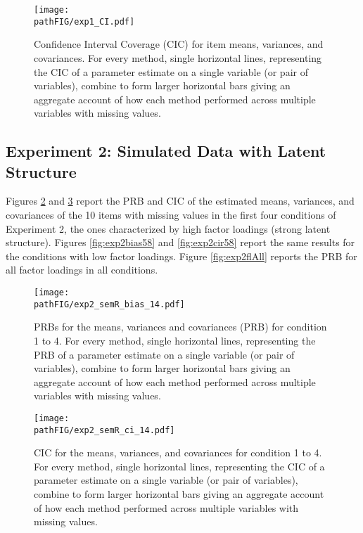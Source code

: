 \documentclass[]{./cls/interact}
\theoremstyle{plain}
\theoremstyle{definition}
\theoremstyle{remark}
\newcommand{\pathFIG}{./figures}
\begin{document}
\begin{figure}
\centering
\texttt{[image: \\pathFIG/exp1\_CI.pdf]}
\caption{\label{fig:exp1cir}
	Confidence Interval Coverage (CIC) for item means, variances, and covariances. 
	For every method, single horizontal lines, representing the CIC of a parameter estimate on 
	a single variable (or pair of variables), combine to form larger horizontal bars giving an 
	aggregate account of how each method performed across multiple variables with missing values.
	}
\end{figure}

\FloatBarrier


\subsection{Experiment 2: Simulated Data with Latent Structure}

	Figures \ref{fig:exp2bias14} and \ref{fig:exp2cir14} report the PRB and CIC of the estimated means, variances, 
	and covariances of the 10 items with missing values in the first four conditions of Experiment 2, 
	the ones characterized by high factor loadings (strong latent structure).
	Figures \ref{fig:exp2bias58} and \ref{fig:exp2cir58} report the same results for the conditions with low
	factor loadings.
	Figure \ref{fig:exp2flAll} reports the PRB for all factor loadings in all conditions.

\begin{figure}
	\texttt{[image: \\pathFIG/exp2\_semR\_bias\_14.pdf]}
\caption{PRBs for the means, variances and covariances (PRB) for condition 1 to 4.
	For every method, single horizontal lines, representing the PRB of a parameter estimate on 
	a single variable (or pair of variables), combine to form larger horizontal bars giving an 
	aggregate account of how each method performed across multiple variables with missing values.
}
\label{fig:exp2bias14}
\end{figure}

\begin{figure}
	\texttt{[image: \\pathFIG/exp2\_semR\_ci\_14.pdf]}
\caption{CIC for the means, variances, and covariances for condition 1 to 4.
	For every method, single horizontal lines, representing the CIC of a parameter estimate on 
	a single variable (or pair of variables), combine to form larger horizontal bars giving an 
	aggregate account of how each method performed across multiple variables with missing values.
}
\label{fig:exp2cir14}
\end{figure}
\end{document}
